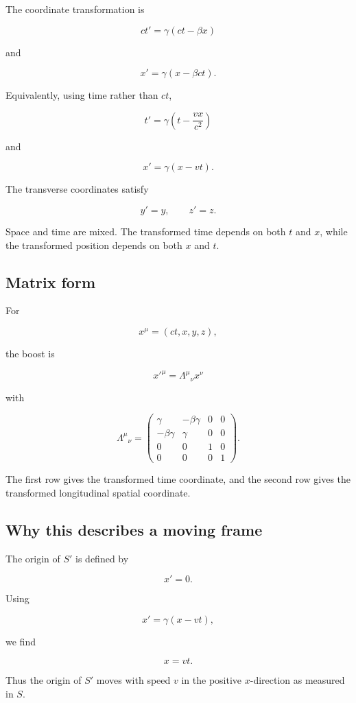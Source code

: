 The coordinate transformation is

\[
\boxed{
ct'
=
\gamma(ct-\beta x)
}
\]

and

\[
\boxed{
x'
=
\gamma(x-\beta ct)
}.
\]

Equivalently, using time rather than \(ct\),

\[
\boxed{
t'
=
\gamma\left(t-
\frac{vx}{c^{2}}
\right)
}
\]

and

\[
\boxed{
x'
=
\gamma(x-vt)
}.
\]

The transverse coordinates satisfy

\[
y'=y,
\qquad
z'=z.
\]

Space and time are mixed. The transformed time depends on both \(t\) and \(x\), while the transformed position depends on both \(x\) and \(t\).

\subsection{Matrix form}

For

\[
x^{\mu}=(ct,x,y,z),
\]

the boost is

\[
\boxed{
x'^{\mu}
=
\Lambda^{\mu}{}_{\nu}x^{\nu}
}
\]

with

\[
\boxed{
\Lambda^{\mu}{}_{\nu}
=
\begin{pmatrix}
\gamma&-\beta\gamma&0&0\\
-\beta\gamma&\gamma&0&0\\
0&0&1&0\\
0&0&0&1
\end{pmatrix}
}.
\]

The first row gives the transformed time coordinate, and the second row gives the transformed longitudinal spatial coordinate.

\subsection{Why this describes a moving frame}

The origin of \(S'\) is defined by

\[
x'=0.
\]

Using

\[
x'=\gamma(x-vt),
\]

we find

\[
x=vt.
\]

Thus the origin of \(S'\) moves with speed \(v\) in the positive \(x\)-direction as measured in \(S\).

